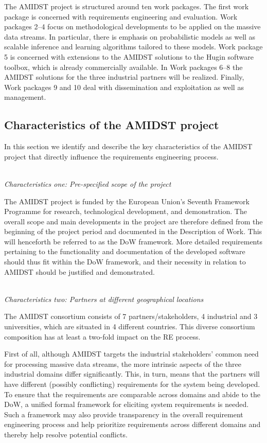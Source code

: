 The AMIDST project is structured around ten work packages. The first work package is concerned with requirements
engineering and evaluation. Work packages 2--4 focus on methodological developments to be applied on the massive data streams.  In particular, there is emphasis on probabilistic models as well as scalable inference and learning
algorithms tailored to these models. Work package 5 is concerned with extensions to the AMIDST solutions to the Hugin software toolbox, which is already commercially available.  In Work packages 6--8 the AMIDST solutions for the three industrial partners will be realized. Finally, Work packages 9 and 10 deal with dissemination and exploitation as well as management.     

\subsection{Characteristics of the AMIDST project}
\label{sec:characteristics}

In this section we identify and describe the key characteristics of the AMIDST project that directly influence the 
requirements
engineering process. 

\ \\
\noindent \emph{Characteristics one:  Pre-specified scope of the project}
\label{sec:characteristic1}

\noindent
The AMIDST project is funded by the European Union's Seventh Framework Programme for research, technological
development, and demonstration. The overall scope and main developments in the project are therefore defined from the
beginning of the project period and documented in the Description of Work. This will henceforth be referred to
as the DoW framework. More detailed requirements pertaining
to the functionality and documentation of the developed software should thus fit within the DoW framework, and their
necessity in relation to AMIDST should be justified and demonstrated.   


 

\ \\
\noindent \emph{Characteristics two: Partners at different geographical locations}
\label{sec:characteristic2}

\noindent The AMIDST consortium consists of 7 partners/stakeholders, 4 industrial and 3 universities, which are situated in 4 different
countries. This diverse consortium composition has at least a two-fold impact on the RE process.

First of
all, although AMIDST targets the industrial stakeholders' common need for processing massive data streams, the more
intrinsic aspects of the three industrial domains differ significantly. This, in turn, means that the partners will have different
(possibly conflicting) requirements for the system being developed. To ensure that the requirements are comparable
across domains and abide to the DoW, a unified formal framework for eliciting system requirements is needed. Such a
framework may also provide transparency in the overall requirement engineering process and help prioritize requirements
across different domains and thereby help resolve potential conflicts.   

